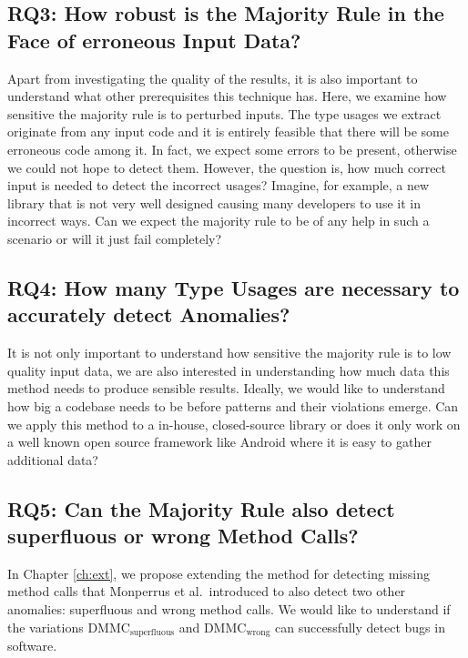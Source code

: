 \subsection{RQ3: How robust is the Majority Rule in the Face of erroneous Input Data?}


Apart from investigating the quality of the results, it is also important to understand what other prerequisites this technique has.
Here, we examine how sensitive the majority rule is to perturbed inputs.
The type usages we extract originate from any input code and it is entirely feasible that there will be some erroneous code among it.
In fact, we expect some errors to be present, otherwise we could not hope to detect them.
However, the question is, how much correct input is needed to detect the incorrect usages?
Imagine, for example, a new library that is not very well designed causing many developers to use it in incorrect ways.
Can we expect the majority rule to be of any help in such a scenario or will it just fail completely?

\subsection{RQ4: How many Type Usages are necessary to accurately detect Anomalies?}

It is not only important to understand how sensitive the majority rule is to low quality input data, we are also interested in understanding how much data this method needs to produce sensible results.
Ideally, we would like to understand how big a codebase needs to be before patterns and their violations emerge.
Can we apply this method to a in-house, closed-source library or does it only work on a well known open source framework like Android where it is easy to gather additional data?

\subsection{RQ5: Can the Majority Rule also detect superfluous or wrong Method Calls?}

In Chapter \ref{ch:ext}, we propose extending the method for detecting missing method calls that Monperrus et al.\ introduced to also detect two other anomalies: superfluous and wrong method calls.
We would like to understand if the variations $\text{DMMC}_\text{superfluous}$ and $\text{DMMC}_\text{wrong}$ can successfully detect bugs in software.

